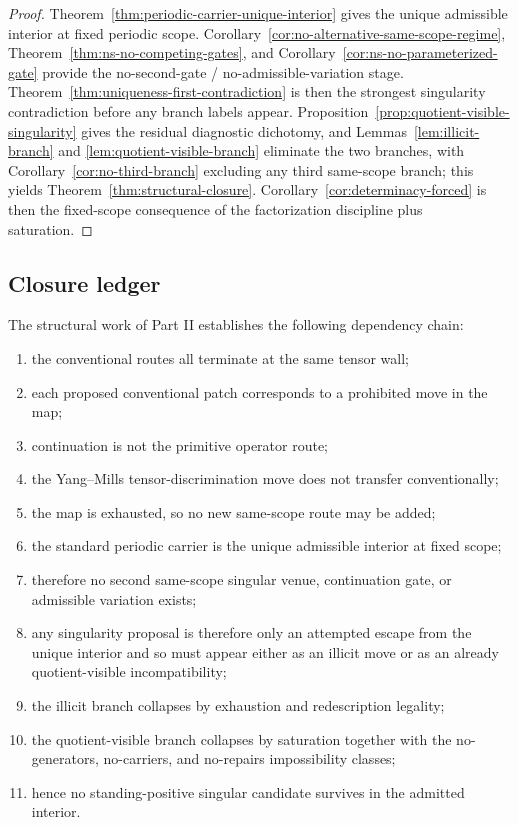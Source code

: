 \begin{proof}
Theorem~\ref{thm:periodic-carrier-unique-interior} gives the unique admissible interior at fixed periodic scope. Corollary~\ref{cor:no-alternative-same-scope-regime}, Theorem~\ref{thm:ns-no-competing-gates}, and Corollary~\ref{cor:ns-no-parameterized-gate} provide the no-second-gate / no-admissible-variation stage. Theorem~\ref{thm:uniqueness-first-contradiction} is then the strongest singularity contradiction before any branch labels appear. Proposition~\ref{prop:quotient-visible-singularity} gives the residual diagnostic dichotomy, and Lemmas~\ref{lem:illicit-branch} and \ref{lem:quotient-visible-branch} eliminate the two branches, with Corollary~\ref{cor:no-third-branch} excluding any third same-scope branch; this yields Theorem~\ref{thm:structural-closure}. Corollary~\ref{cor:determinacy-forced} is then the fixed-scope consequence of the factorization discipline plus saturation.
\end{proof}

\subsection{Closure ledger}
The structural work of Part II establishes the following dependency chain:
\begin{enumerate}[label=(\arabic*), leftmargin=2.2em]
\item the conventional routes all terminate at the same tensor wall;
\item each proposed conventional patch corresponds to a prohibited move in the map;
\item continuation is not the primitive operator route;
\item the Yang--Mills tensor-discrimination move does not transfer conventionally;
\item the map is exhausted, so no new same-scope route may be added;
\item the standard periodic carrier is the unique admissible interior at fixed scope;
\item therefore no second same-scope singular venue, continuation gate, or admissible variation exists;
\item any singularity proposal is therefore only an attempted escape from the unique interior and so must appear either as an illicit move or as an already quotient-visible incompatibility;
\item the illicit branch collapses by exhaustion and redescription legality;
\item the quotient-visible branch collapses by saturation together with the no-generators,
no-carriers, and no-repairs impossibility classes;
\item hence no standing-positive singular candidate survives in the admitted interior.
\end{enumerate}

\newpage

